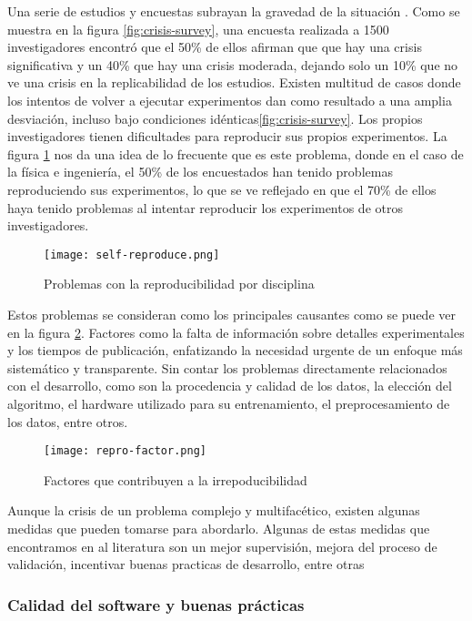 Una serie de estudios y encuestas subrayan la gravedad de la situación \cite{Baker_2016}.
Como se muestra en la figura \ref{fig:crisis-survey}, una encuesta realizada a 1500 investigadores
encontró que el 50\% de ellos afirman que que hay una crisis significativa y un 40\% que hay
una crisis moderada, dejando solo un 10\% que no ve una crisis en la replicabilidad de los estudios.
Existen multitud de casos donde los intentos de volver a ejecutar experimentos dan como resultado 
a una amplia desviación, incluso bajo condiciones idénticas\ref{fig:crisis-survey}.
Los propios investigadores tienen dificultades para reproducir sus propios experimentos.
La figura \ref{fig:self-reproduce} nos da una idea de lo frecuente que es este problema,
donde en el caso de la física e ingeniería, el 50\% de los encuestados han tenido problemas
reproduciendo sus experimentos, lo que se ve reflejado en que el 70\% de ellos haya tenido
problemas al intentar reproducir los experimentos de otros investigadores.

\begin{figure}[ht]
    \centering
    \texttt{[image: self-reproduce.png]}
    \caption{Problemas con la reproducibilidad por disciplina \cite{Baker_2016}}\label{fig:self-reproduce}
\end{figure}

Estos problemas se consideran como los principales causantes como se puede ver en la figura \ref{fig:repro-factor}.
Factores como la falta de información sobre detalles experimentales y los tiempos de publicación, enfatizando 
la necesidad urgente de un enfoque más sistemático y transparente. Sin contar los problemas
directamente relacionados con el desarrollo, como son la procedencia y calidad de los datos, la 
elección del algoritmo, el hardware utilizado para su entrenamiento, el preprocesamiento de 
los datos, entre otros.

\begin{figure}[ht]
    \centering
    \texttt{[image: repro-factor.png]}
    \caption{Factores que contribuyen a la irrepoducibilidad \cite{Baker_2016}}\label{fig:repro-factor}
\end{figure}

Aunque la crisis de un problema complejo y multifacético, existen
algunas medidas que pueden tomarse para abordarlo. Algunas de estas medidas que encontramos
en al literatura son un mejor supervisión, mejora del proceso de validación, incentivar
buenas practicas de desarrollo, entre otras

\subsubsection{Calidad del software y buenas prácticas}


\pagebreak